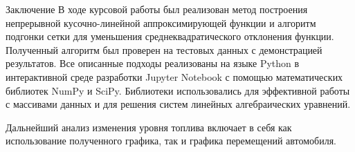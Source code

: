 \documentclass[ignoreonframetext,unicode]{beamer}
\begin{document}




\begin{frame}{Заключение}{}
	\small
	В ходе курсовой работы был реализован метод построения непрерывной кусочно-линейной аппроксимирующей функции и алгоритм подгонки сетки для уменьшения среднеквадратического отклонения функции. Полученный алгоритм был проверен на тестовых данных с демонстрацией результатов.
	Все описанные подходы реализованы на языке Python в интерактивной среде разработки Jupyter Notebook с помощью математических библиотек NumPy и SciPy. Библиотеки использовались для эффективной работы с массивами данных и для решения систем линейных алгебраических уравнений.
		
	Дальнейший анализ изменения уровня топлива включает в себя как использование полученного графика, так и графика перемещений автомобиля.
\end{frame}
\end{document}
